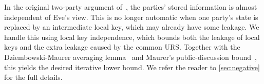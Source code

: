 In the original two-party argument of~\cite{EC:DziMau04}, the parties' stored information is almost independent of Eve's view. This is no longer automatic when one party's state is replaced by an intermediate local key, which may already have some leakage. We handle this using local key independence, which bounds both the leakage of local keys and the extra leakage caused by the common URS. Together with the Dziembowski-Maurer averaging lemma~\cite{EC:DziMau04} and Maurer's public-discussion bound~\cite{Maurer93}, this yields the desired iterative lower bound. We refer the reader to \cref{sec:negative} for the full details.

